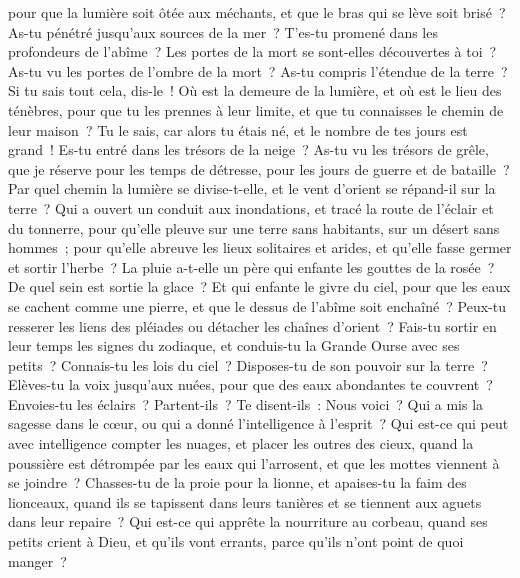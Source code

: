 \begin{multicols}{2}
pour que la lumière soit ôtée aux méchants, et que le bras qui se lève soit brisé~?
As-tu pénétré jusqu'aux sources de la mer~? T'es-tu promené dans les profondeurs de l'abîme~?
Les portes de la mort se sont-elles découvertes à toi~? As-tu vu les portes de l'ombre de la mort~?
As-tu compris l'étendue de la terre~? Si tu sais tout cela, dis-le~!
Où est la demeure de la lumière, et où est le lieu des ténèbres,
pour que tu les prennes à leur limite, et que tu connaisses le chemin de leur maison~?
Tu le sais, car alors tu étais né, et le nombre de tes jours est grand~!
Es-tu entré dans les trésors de la neige~? As-tu vu les trésors de grêle,
que je réserve pour les temps de détresse, pour les jours de guerre et de bataille~?
Par quel chemin la lumière se divise-t-elle, et le vent d'orient se répand-il sur la terre~?
Qui a ouvert un conduit aux inondations, et tracé la route de l'éclair et du tonnerre,
pour qu'elle pleuve sur une terre sans habitants, sur un désert sans hommes~;
pour qu'elle abreuve les lieux solitaires et arides, et qu'elle fasse germer et sortir l'herbe~?
La pluie a-t-elle un père qui enfante les gouttes de la rosée~?
De quel sein est sortie la glace~? Et qui enfante le givre du ciel,
pour que les eaux se cachent comme une pierre, et que le dessus de l'abîme soit enchaîné~?
Peux-tu resserer les liens des pléiades ou détacher les chaînes d'orient~?
Fais-tu sortir en leur temps les signes du zodiaque, et conduis-tu la Grande Ourse avec ses petits~?
Connais-tu les lois du ciel~? Disposes-tu de son pouvoir sur la terre~?
Elèves-tu la voix jusqu'aux nuées, pour que des eaux abondantes te couvrent~?
Envoies-tu les éclairs~? Partent-ils~? Te disent-ils~: Nous voici~?
Qui a mis la sagesse dans le cœur, ou qui a donné l'intelligence à l'esprit~?
Qui est-ce qui peut avec intelligence compter les nuages, et placer les outres des cieux,
quand la poussière est détrompée par les eaux qui l'arrosent, et que les mottes viennent à se joindre~?
\VerseOne{}Chasses-tu de la proie pour la lionne, et apaises-tu la faim des lionceaux,
quand ils se tapissent dans leurs tanières et se tiennent aux aguets dans leur repaire~?
Qui est-ce qui apprête la nourriture au corbeau, quand ses petits crient à Dieu, et qu'ils vont errants, parce qu'ils n'ont point de quoi manger~?

\end{multicols}
